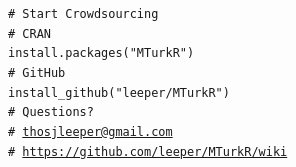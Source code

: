 \documentclass[14pt]{beamer}
\begin{document}
\bgroup
{}
\begin{frame}
    \vspace{1em}
    {\color{white}\texttt{\noindent \# Start Crowdsourcing\\
    \vspace{1.5em}
    \# CRAN\\
    install.packages("MTurkR")\\
    \vspace{1.5em}
    \# GitHub\\
    install\_github("leeper/MTurkR")\\
    \vspace{1.5em}
    \# Questions?\\
    \# \href{mailto:thosjleeper@gmail.com}{thosjleeper@gmail.com}\\
    \# \url{https://github.com/leeper/MTurkR/wiki} }}
\end{frame}
\egroup
\end{document}
